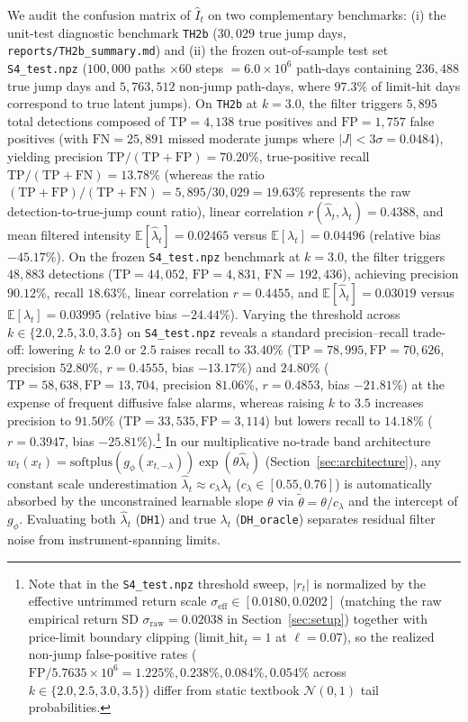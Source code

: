 \documentclass[11pt,a4paper]{article}
\begin{document}
We audit the confusion matrix of $\hat{I}_t$ on two complementary benchmarks: (i) the unit-test diagnostic benchmark \texttt{TH2b} ($30,029$ true jump days, \texttt{reports/TH2b\_summary.md}) and (ii) the frozen out-of-sample test set \texttt{S4\_test.npz} ($100,000$ paths $\times 60$ steps $= 6.0 \times 10^6$ path-days containing $236,488$ true jump days and $5,763,512$ non-jump path-days, where $97.3\%$ of limit-hit days correspond to true latent jumps). On \texttt{TH2b} at $k = 3.0$, the filter triggers $5,895$ total detections composed of $\text{TP} = 4,138$ true positives and $\text{FP} = 1,757$ false positives (with $\text{FN} = 25,891$ missed moderate jumps where $|J| < 3\sigma = 0.0484$), yielding precision $\text{TP}/(\text{TP}+\text{FP}) = 70.20\%$, true-positive recall $\text{TP}/(\text{TP}+\text{FN}) = 13.78\%$ (whereas the ratio $(\text{TP}+\text{FP})/(\text{TP}+\text{FN}) = 5,895/30,029 = 19.63\%$ represents the raw detection-to-true-jump count ratio), linear correlation $r(\hat{\lambda}_t, \lambda_t) = 0.4388$, and mean filtered intensity $\mathbb{E}[\hat{\lambda}_t] = 0.02465$ versus $\mathbb{E}[\lambda_t] = 0.04496$ (relative bias $-45.17\%$). On the frozen \texttt{S4\_test.npz} benchmark at $k = 3.0$, the filter triggers $48,883$ detections ($\text{TP} = 44,052$, $\text{FP} = 4,831$, $\text{FN} = 192,436$), achieving precision $90.12\%$, recall $18.63\%$, linear correlation $r = 0.4455$, and $\mathbb{E}[\hat{\lambda}_t] = 0.03019$ versus $\mathbb{E}[\lambda_t] = 0.03995$ (relative bias $-24.44\%$). Varying the threshold across $k \in \{2.0, 2.5, 3.0, 3.5\}$ on \texttt{S4\_test.npz} reveals a standard precision--recall trade-off: lowering $k$ to $2.0$ or $2.5$ raises recall to $33.40\%$ ($\text{TP}=78,995, \text{FP}=70,626$, precision $52.80\%$, $r=0.4555$, bias $-13.17\%$) and $24.80\%$ ($\text{TP}=58,638, \text{FP}=13,704$, precision $81.06\%$, $r=0.4853$, bias $-21.81\%$) at the expense of frequent diffusive false alarms, whereas raising $k$ to $3.5$ increases precision to $91.50\%$ ($\text{TP}=33,535, \text{FP}=3,114$) but lowers recall to $14.18\%$ ($r=0.3947$, bias $-25.81\%$).\footnote{Note that in the \texttt{S4\_test.npz} threshold sweep, $|r_t|$ is normalized by the effective untrimmed return scale $\sigma_{\text{eff}} \in [0.0180, 0.0202]$ (matching the raw empirical return SD $\sigma_{\text{raw}} = 0.02038$ in Section~\ref{sec:setup}) together with price-limit boundary clipping ($\text{limit\_hit}_t = 1$ at $\ell = 0.07$), so the realized non-jump false-positive rates ($\text{FP}/5.7635\times 10^6 = 1.225\%, 0.238\%, 0.084\%, 0.054\%$ across $k \in \{2.0, 2.5, 3.0, 3.5\}$) differ from static textbook $\mathcal{N}(0,1)$ tail probabilities.} In our multiplicative no-trade band architecture $w_t(x_t) = \text{softplus}(g_\phi(x_{t,-\lambda}))\exp(\theta\hat{\lambda}_t)$ (Section~\ref{sec:architecture}), any constant scale underestimation $\hat{\lambda}_t \approx c_\lambda \lambda_t$ ($c_\lambda \in [0.55, 0.76]$) is automatically absorbed by the unconstrained learnable slope $\theta$ via $\tilde{\theta} = \theta / c_\lambda$ and the intercept of $g_\phi$. Evaluating both $\hat{\lambda}_t$ (\texttt{DH1}) and true $\lambda_t$ (\texttt{DH\_oracle}) separates residual filter noise from instrument-spanning limits.
\end{document}
